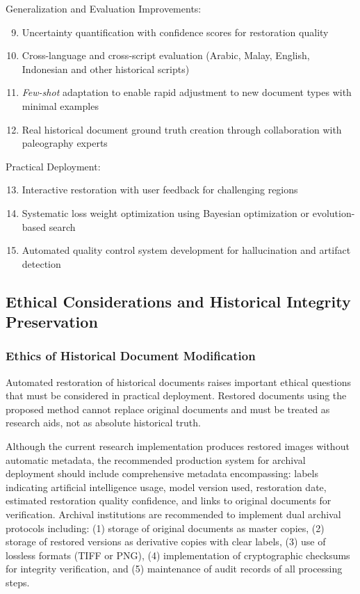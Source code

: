 \documentclass[journal]{IEEEtran}
\begin{document}
Generalization and Evaluation Improvements:
\begin{enumerate}
    \setcounter{enumi}{8}
    \item Uncertainty quantification with confidence scores for restoration quality
    \item Cross-language and cross-script evaluation (Arabic, Malay, English, Indonesian and other historical scripts)
    \item \textit{Few-shot} adaptation to enable rapid adjustment to new document types with minimal examples
    \item Real historical document ground truth creation through collaboration with paleography experts
\end{enumerate}

Practical Deployment:
\begin{enumerate}
    \setcounter{enumi}{12}
    \item Interactive restoration with user feedback for challenging regions
    \item Systematic loss weight optimization using Bayesian optimization or evolution-based search
    \item Automated quality control system development for hallucination and artifact detection
\end{enumerate}

\subsection{Ethical Considerations and Historical Integrity Preservation}

\subsubsection{Ethics of Historical Document Modification}

Automated restoration of historical documents raises important ethical questions that must be considered in practical deployment. Restored documents using the proposed method cannot replace original documents and must be treated as research aids, not as absolute historical truth.

Although the current research implementation produces restored images without automatic metadata, the recommended production system for archival deployment should include comprehensive metadata encompassing: labels indicating artificial intelligence usage, model version used, restoration date, estimated restoration quality confidence, and links to original documents for verification. Archival institutions are recommended to implement dual archival protocols including: (1) storage of original documents as master copies, (2) storage of restored versions as derivative copies with clear labels, (3) use of lossless formats (TIFF or PNG), (4) implementation of cryptographic checksums for integrity verification, and (5) maintenance of audit records of all processing steps.
\end{document}
